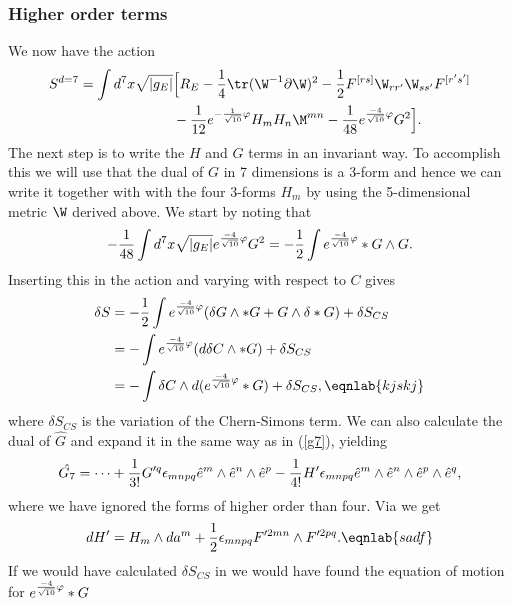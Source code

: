\subsubsection{Higher order terms}


We now have the action
\begin{align}
S^{d=7} = \int d^7x \sqrt{|g_E|} &\Big{[} R_E - \frac{1}{4}\tr(\W^{-1}\partial \W)^2 - {1 \over 2}F^{[rs]}\W_{rr'}\W_{ss'}F^{[r's']}\nonumber\\ 
& - {1 \over 12}e^{-{1 \over \sqrt{10}} \varphi}H_mH_n\M^{mn} - {1 \over 48}e^{{-4 \over \sqrt{10}}\varphi}G^2 \Big{]}.
\label{asdfghjkl}
\end{align}
The next step is to write the $H$ and $G$ terms in an  invariant way. To accomplish this we will use that the 
dual of $G$ in 7 dimensions is a 3-form and hence we can write it together with with the four 3-forms $H_m$ by using the 5-dimensional metric $\W$ 
derived above. We start by noting that
\begin{equation}
-{1 \over 48}\int d^7x \sqrt{|g_E|} e^{{-4 \over \sqrt{10}}\varphi}G^2 = -{1 \over 2}\int e^{{-4 \over \sqrt{10}}\varphi} *G \wedge G.
\end{equation}
Inserting this in the action and varying with respect to $C$ gives
\begin{align}
\delta S &=-{1 \over 2}\int e^{{-4 \over \sqrt{10}}\varphi}( \delta G \wedge *G + G \wedge \delta*G ) + \delta S_{CS} \nonumber \\
& =-\int e^{{-4 \over \sqrt{10}}\varphi}( d \delta C \wedge *G ) + \delta S_{CS} \nonumber \\
& =- \int \delta C \wedge d(e^{{-4 \over \sqrt{10}}\varphi}*G) + \delta S_{CS},
\eqnlab{kjskj}
\end{align}
where $\delta S_{CS}$ is the variation of the Chern-Simons term. We can also calculate the dual of $\hat{G}$ and expand it in the same way 
as in (\ref{g7}), yielding
\begin{equation}
\hat{G_7}= \cdots +{1 \over 3!}G'^q \epsilon_{mnpq} \hat{e}^m \wedge \hat{e}^n \wedge \hat{e}^p - {1 \over 4!}H' \epsilon_{mnpq} \hat{e}^m \wedge \hat{e}^n \wedge \hat{e}^p \wedge \hat{e}^q, 
\end{equation}
where we have ignored the forms of higher order than four. Via  we get
\begin{equation}
dH'=H_m \wedge da^m + {1 \over 2}\epsilon_{mnpq}F'^{2mn} \wedge F'^{2pq}.
\eqnlab{sadf}
\end{equation}
If we would have calculated $\delta S_{CS}$ in  we would have found the equation of motion for $e^{{-4 \over \sqrt{10}}\varphi}*G$ 
